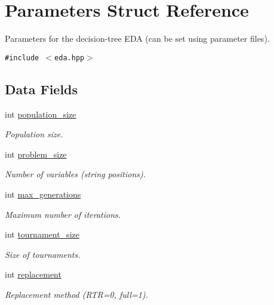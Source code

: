 \hypertarget{struct_parameters}{
\section{Parameters Struct Reference}
\label{struct_parameters}
}
Parameters for the decision-tree EDA (can be set using parameter files).  


{\tt \#include $<$eda.hpp$>$}

\subsection*{Data Fields}
\begin{CompactItemize}
\item 
int \hyperlink{struct_parameters_7d367fca1aa50edd6c5ebd6c34dab46f}{population\_\-size}
\begin{CompactList}\small\item\em Population size. \item\end{CompactList}\item 
int \hyperlink{struct_parameters_451e60ea6b3d784e1093ca2a475ccec9}{problem\_\-size}
\begin{CompactList}\small\item\em Number of variables (string positions). \item\end{CompactList}\item 
int \hyperlink{struct_parameters_d796bbf20113a349eed4f469fb80e04f}{max\_\-generations}
\begin{CompactList}\small\item\em Maximum number of iterations. \item\end{CompactList}\item 
int \hyperlink{struct_parameters_8b65ec8ae34b43aab58df88d3a4fa160}{tournament\_\-size}
\begin{CompactList}\small\item\em Size of tournaments. \item\end{CompactList}\item 
int \hyperlink{struct_parameters_64e0afb8fed55d4ede2af277ad258d42}{replacement}
\begin{CompactList}\small\item\em Replacement method (RTR=0, full=1). \item\end{CompactList}\item 

\end{CompactItemize}
